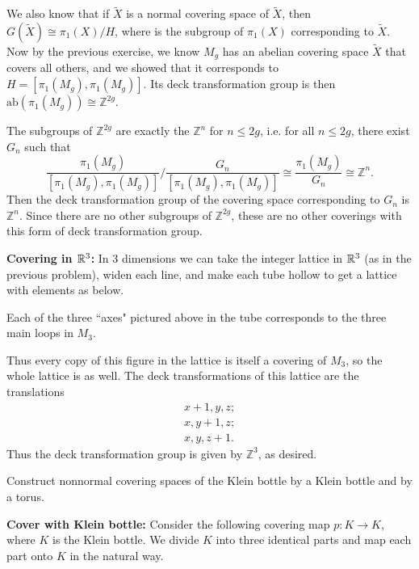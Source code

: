 \documentclass[twoside,10pt]{article}
\begin{document}
We also know that if $\tilde{X}$ is a normal covering space of $\tilde{X}$, then $G(\tilde{X}) \cong \pi_1(X) / H$, where is the subgroup of $\pi_1(X)$ corresponding to $\tilde{X}$. Now by the previous exercise, we know $M_g$ has an abelian covering space $\tilde{X}$ that covers all others, and we showed that it corresponds to $H = \left[ \pi_1(M_g), \pi_1(M_g) \right]$. Its deck transformation group is then $\text{ab}(\pi_1(M_g)) \cong \mathbb{Z}^{2g}$.

The subgroups of $\mathbb{Z}^{2g}$ are exactly the $\mathbb{Z}^n$ for $n \leq 2g$, i.e. for all $n \leq 2g$, there exist $G_n$ such that
\[
	\frac{\pi_1(M_g)}{\left[ \pi_1(M_g), \pi_1(M_g) \right]} / \frac{G_n}{\left[ \pi_1(M_g), \pi_1(M_g) \right]} \cong \frac{\pi_1(M_g)}{G_n} \cong \mathbb{Z}^{n}.
\] Then the deck transformation group of the covering space corresponding to $G_n$ is $\mathbb{Z}^{n}$. Since there are no other subgroups of $\mathbb{Z}^{2g}$, these are no other coverings with this form of deck transformation group.

\newpage
\textbf{Covering in $\mathbb{R}^{3}$:} In 3 dimensions we can take the integer lattice in $\mathbb{R}^{3}$ (as in the previous problem), widen each line, and make each tube hollow to get a lattice with elements as below.

\vspace{2in}

Each of the three ``axes" pictured above in the tube corresponds to the three main loops in $M_3$.

\vspace{2in}

Thus every copy of this figure in the lattice is itself a covering of $M_3$, so the whole lattice is as well. The deck transformations of this lattice are the translations
\begin{align*}
	x+1, y, z; \\
	x, y+1, z; \\
	x, y, z+1.
\end{align*}
Thus the deck transformation group is given by $\mathbb{Z}^{3}$, as desired.

\newpage

\begin{exer}[1.3: 20]
Construct nonnormal covering spaces of the Klein bottle by a Klein bottle and by a torus.
\end{exer}

\textbf{Cover with Klein bottle:} Consider the following covering map $ p:K\to K$, where $K$ is the Klein bottle. We divide $K$ into three identical parts and map each part onto $K$ in the natural way.
\end{document}
